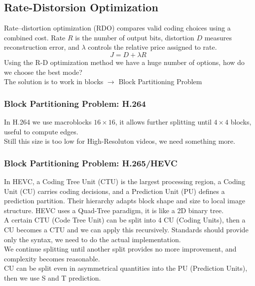 \subsection{Rate-Distorsion Optimization}
Rate--distortion optimization (RDO) compares valid coding choices using a combined cost. Rate $R$ is the number of output bits, distortion $D$ measures reconstruction error, and $\lambda$ controls the relative price assigned to rate.
$$J = D + \lambda R$$
Using the R-D optimization method we have a huge number of options, how do we choose the best mode?\\
The solution is to work in blocks $\to$ Block Partitioning Problem
\subsubsection{Block Partitioning Problem: H.264}
In H.264 we use macroblocks $16 \times 16$, it allows further splitting until $4 \times 4$ blocks, useful to compute edges.\\
Still this size is too low for High-Resoluton videos, we need something more.
\subsubsection{Block Partitioning Problem: H.265/HEVC}
In HEVC, a Coding Tree Unit (CTU) is the largest processing region, a Coding Unit (CU) carries coding decisions, and a Prediction Unit (PU) defines a prediction partition. Their hierarchy adapts block shape and size to local image structure.
HEVC uses a Quad-Tree paradigm, it is like a 2D binary tree.\\
A certain CTU (Code Tree Unit) can be split into 4 CU (Coding Units), then a CU becomes a CTU and we can apply this recursively.
Standards should provide only the syntax, we need to do the actual implementation.\\
We continue splitting until another split provides no more improvement, and complexity becomes reasonable.\\
CU can be split even in asymmetrical quantities into the PU (Prediction Units), then we use S and T prediction.
